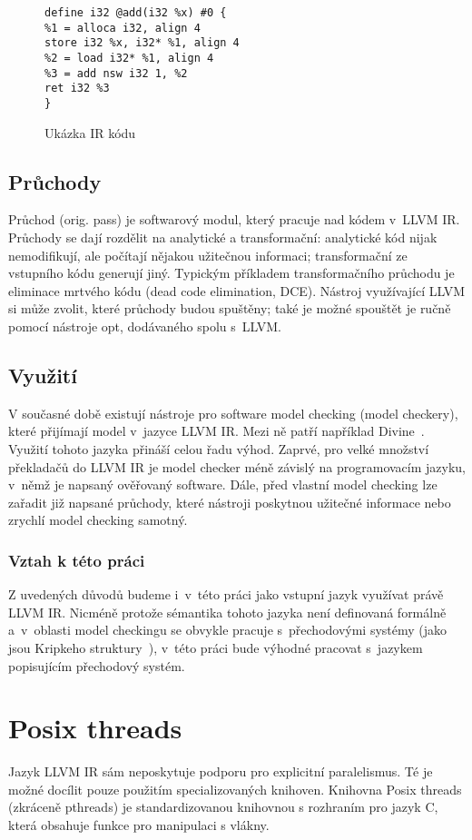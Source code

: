 \documentclass[10pt,a4paper,notitlepage]{report}
\begin{document}
\begin{figure}[h!]
\begin{lstlisting}
define i32 @add(i32 %x) #0 {
%1 = alloca i32, align 4
store i32 %x, i32* %1, align 4
%2 = load i32* %1, align 4
%3 = add nsw i32 1, %2
ret i32 %3
}
\end{lstlisting}
\caption{Ukázka IR kódu}
\label{IR-EX}
\end{figure}

\subsection{Průchody}
Průchod (orig. pass) je softwarový modul, který pracuje nad kódem v~LLVM IR. Průchody se dají rozdělit na analytické a transformační: analytické kód nijak nemodifikují, ale počítají nějakou užitečnou informaci; transformační ze vstupního kódu generují jiný. Typickým příkladem transformačního průchodu je eliminace mrtvého kódu (dead code elimination, DCE). Nástroj využívající LLVM si může zvolit, které průchody budou spuštěny; také je možné spouštět je ručně pomocí nástroje opt, dodávaného spolu s~LLVM.

\subsection{Využití}
V současné době existují nástroje pro software model checking (model checkery), které přijímají model v~jazyce LLVM IR. Mezi ně patří například Divine~\cite{BBH+13}. Využití tohoto jazyka přináší celou řadu výhod. Zaprvé, pro velké množství překladačů do LLVM IR je model checker méně závislý na programovacím jazyku, v~němž je napsaný ověřovaný software. Dále, před vlastní model checking lze zařadit již napsané průchody, které nástroji poskytnou užitečné informace nebo zrychlí model checking samotný.

\subsubsection{Vztah k této práci}
Z uvedených důvodů budeme i~v~této práci jako vstupní jazyk využívat právě LLVM IR. Nicméně protože sémantika tohoto jazyka není definovaná formálně a~v~oblasti model checkingu se obvykle pracuje s~přechodovými systémy (jako jsou Kripkeho struktury~\cite{CLARKE}), v~této práci bude výhodné pracovat s~jazykem popisujícím přechodový systém.


\section{Posix threads}
\label{sec:posix-threads}
Jazyk LLVM IR sám neposkytuje podporu pro explicitní paralelismus. Té je možné docílit pouze použitím specializovaných knihoven. Knihovna Posix threads (zkráceně pthreads) je standardizovanou knihovnou s rozhraním pro jazyk C, která obsahuje funkce pro manipulaci s vlákny.
\end{document}
